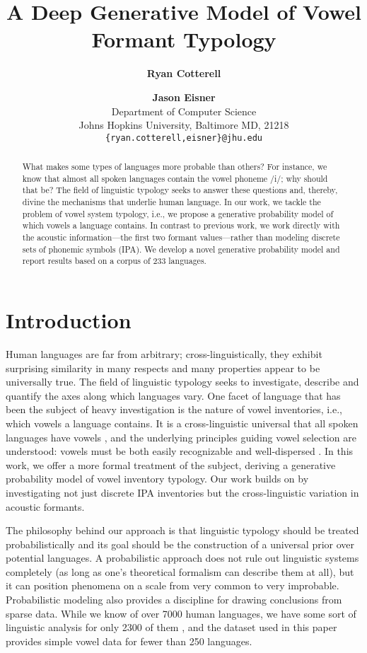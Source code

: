 \documentclass[11pt,a4paper]{article}
\title{A Deep Generative Model of Vowel Formant Typology}
\author{{\bf Ryan Cotterell} \and {\bf Jason Eisner} \\ Department of Computer Science \\ Johns Hopkins University, Baltimore MD, 21218 \\ \texttt{\{ryan.cotterell,eisner\}@jhu.edu}}
\begin{document}
\maketitle
\begin{abstract}
  What makes some types of languages more probable than others?
  For instance, we know that almost all spoken languages contain the
  vowel phoneme /i/; why should that be? The field of linguistic typology
  seeks to answer these questions and, thereby, divine the
  mechanisms that underlie human language. In our work,
  we tackle the problem of vowel system typology, i.e.,
  we propose a generative probability model of which vowels a language contains.
  In contrast to previous work, we work directly with the acoustic
  information---the first two formant values---rather than modeling discrete sets of phonemic symbols (IPA). We develop a novel generative
  probability model and report results based on a corpus of 233 languages.
\end{abstract}

\section{Introduction}
Human languages are far from arbitrary; cross-linguistically, they
exhibit surprising similarity in many respects and many properties appear to be universally
true. The field of linguistic typology seeks to investigate, describe
and quantify the axes along which languages vary. One facet of
language that has been the subject of heavy investigation is the
nature of vowel inventories, i.e., which vowels a language
contains. It is a cross-linguistic universal that all spoken languages have
vowels \cite{gordon}, and the underlying principles guiding vowel selection are
understood: vowels must be both easily recognizable
and well-dispersed \cite{schwartz2005dispersion}. In this
work, we offer a more formal treatment of the subject, deriving a generative probability model of vowel inventory typology.  Our work builds on
\cite{cotterell-eisner:2017:ACL2017} by investigating not just
discrete IPA inventories but the cross-linguistic variation
in acoustic formants.

The philosophy behind our approach is that linguistic typology
should be treated probabilistically and its goal should be the construction of a universal prior
over potential languages.
A probabilistic approach does not rule out linguistic systems
completely (as long as one's theoretical formalism can describe them
at all), but it can position phenomena on a scale from very common to
very improbable.  Probabilistic modeling also provides a discipline
for drawing conclusions from sparse data.  While we know of over 7000
human languages, we have some sort of linguistic analysis for only
2300 of them \cite{wals-s1}, and the dataset used in this paper
\cite{becker2010acoustic} provides simple vowel data for fewer than
250 languages.
\end{document}
